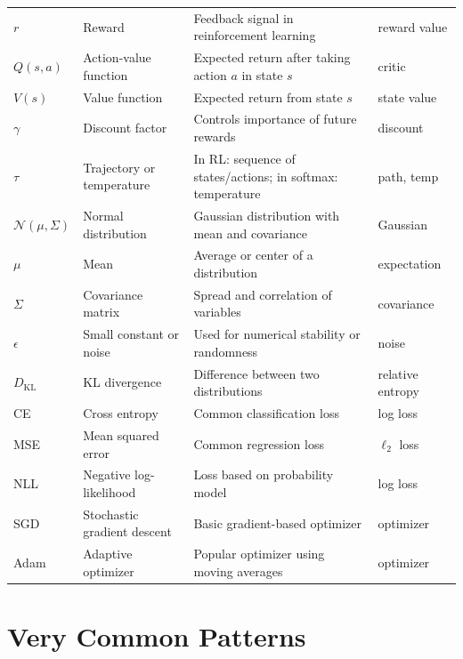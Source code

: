 \documentclass{article}
\begin{document}
\begin{longtable}{>{\centering\arraybackslash}p{2.2cm} p{3.5cm} p{5cm} p{3.5cm}}
$r$ & Reward & Feedback signal in reinforcement learning & reward value \\

$Q(s,a)$ & Action-value function & Expected return after taking action $a$ in state $s$ & critic \\

$V(s)$ & Value function & Expected return from state $s$ & state value \\

$\gamma$ & Discount factor & Controls importance of future rewards & discount \\

$\tau$ & Trajectory or temperature & In RL: sequence of states/actions; in softmax: temperature & path, temp \\

$\mathcal{N}(\mu,\Sigma)$ & Normal distribution & Gaussian distribution with mean and covariance & Gaussian \\

$\mu$ & Mean & Average or center of a distribution & expectation \\

$\Sigma$ & Covariance matrix & Spread and correlation of variables & covariance \\

$\epsilon$ & Small constant or noise & Used for numerical stability or randomness & noise \\

$D_{\mathrm{KL}}$ & KL divergence & Difference between two distributions & relative entropy \\

CE & Cross entropy & Common classification loss & log loss \\

MSE & Mean squared error & Common regression loss & $\ell_2$ loss \\

NLL & Negative log-likelihood & Loss based on probability model & log loss \\

SGD & Stochastic gradient descent & Basic gradient-based optimizer & optimizer \\

Adam & Adaptive optimizer & Popular optimizer using moving averages & optimizer \\

\bottomrule
\end{longtable}

\section*{Very Common Patterns}
\end{document}
